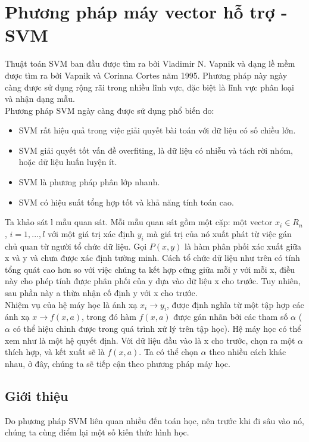 \documentclass[12pt,a4paper]{article}
\begin{document}
\newpage
\section{Phương pháp máy vector hỗ trợ - SVM}
Thuật toán SVM ban đầu được tìm ra bởi  Vladimir N. Vapnik và dạng lề mềm được tìm ra bởi Vapnik và Corinna Cortes năm 1995.
Phương pháp này ngày càng được sử dụng rộng rãi trong nhiều lĩnh vực, đặc biệt là
lĩnh vực phân loại và nhận dạng mẫu. \\
Phương pháp SVM ngày càng được sử dụng phổ biến do:
\begin{itemize}
\item SVM rất hiệu quả trong việc giải quyết bài toán với dữ liệu có số chiều lớn.
\item SVM giải quyết tốt vấn đề overfiting, là dữ liệu có nhiễu và tách rời nhóm, hoặc dữ liệu huấn luyện ít.
\item SVM là phương pháp phân lớp nhanh.
\item SVM có hiệu suất tổng hợp tốt và khả năng tính toán cao.
\end{itemize}
Ta khảo sát l mẫu quan sát. Mỗi mẫu quan sát gồm một cặp: một vector $x_i \in R_n$, $i=1,...,l$ với một giá trị xác định $y_i$ mà giá trị của nó xuất phát từ việc gán chủ quan từ người tổ chức dữ liệu. Gọi $P(x,y)$ là hàm phân phối xác xuất  giữa x và y và chưa được xác định tường minh. Cách tổ chức dữ liệu như trên có tính tổng quát cao hơn so với việc chúng ta kết hợp cứng giữa mỗi y với mỗi x, điều này cho phép tính được phân phối của y dựa vào dữ liệu x cho trước. Tuy nhiên, sau phần này a thừa nhận cố định y với x cho trước.\\
\indent Nhiệm vụ của hệ máy học là ánh xạ $x_i \rightarrow y_i$, được định nghĩa từ một tập hợp các ánh xạ $x \rightarrow f(x,a)$, trong đó hàm $f(x,a)$ được gán nhãn bởi các tham số $\alpha$ ($\alpha$ có thể hiệu chỉnh được trong quá trình xử lý trên tập học). Hệ máy học có thể xem như là một hệ quyết định. Với dữ liệu đầu vào là x cho trước, chọn ra một $\alpha$ thích hợp, và kết xuất sẽ là $f(x,a)$. Ta có thể chọn $\alpha$ theo nhiều cách khác nhau, ở đây, chúng ta sẽ tiếp cận theo phương pháp máy học.
\subsection{Giới thiệu}
Do phương pháp SVM liên quan nhiều đến toán học, nên trước khi đi sâu vào nó, chúng ta cùng điểm lại một số kiến thức hình học.
\end{document}
